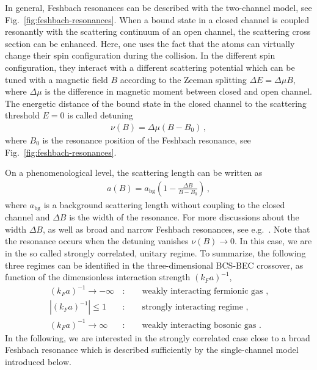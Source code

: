 In general, Feshbach resonances can be described with the two-channel model, see Fig.~\ref{fig:feshbach-resonances}. When a bound state in a closed channel is coupled resonantly with the scattering continuum of an open channel, the scattering cross section can be enhanced. Here, one uses the fact that the atoms can virtually change their spin configuration during the collision. In the different spin configuration, they interact with a different scattering potential which can be tuned with a magnetic field $B$ according to the Zeeman splitting $\Delta E=\Delta\mu B$, where $\Delta\mu$ is the difference in magnetic moment between closed and open channel. The energetic distance of the bound state in the closed channel to the scattering threshold $E=0$ is called detuning~\cite{Faigle-Cedzich2022}
%
\begin{align}
	\label{eq:detuning}
	\nu(B) = \Delta\mu (B-B_0) \,,
\end{align}
%
where $B_0$ is the resonance position of the Feshbach resonance, see Fig.~\ref{fig:feshbach-resonances}.

On a phenomenological level, the scattering length can be written as
%
\begin{align}
	\label{eq:scattering-length}
	a(B) = a_{\mathrm{bg}} \left(1-\frac{\Delta B}{B-B_0}\right) \,,
\end{align}
%
where $a_{\mathrm{bg}}$ is a background scattering length without coupling to the closed channel and $\Delta B$ is the width of the resonance. For more discussions about the width $\Delta B$, as well as broad and narrow Feshbach resonances, see e.g.~\cite{Diehl2006-1}. Note that the resonance occurs when the detuning vanishes $\nu(B)\rightarrow 0$. In this case, we are in the so called strongly correlated, unitary regime. To summarize, the following three regimes can be identified in the three-dimensional BCS-BEC crossover, as function of the dimensionless interaction strength $(k_Fa)^{-1}$,
%
\begin{align*}
	(k_F a)^{-1} \rightarrow -\infty \,&: \qquad \text{weakly interacting fermionic gas ,} \\
	|(k_F a)^{-1}| \leq 1 \,&: \qquad \text{strongly interacting regime ,} \\
	(k_F a)^{-1} \rightarrow \infty \,&: \qquad \text{weakly interacting bosonic gas .}
\end{align*}
%
In the following, we are interested in the strongly correlated case close to a broad Feshbach resonance which is described sufficiently by the single-channel model introduced below.


